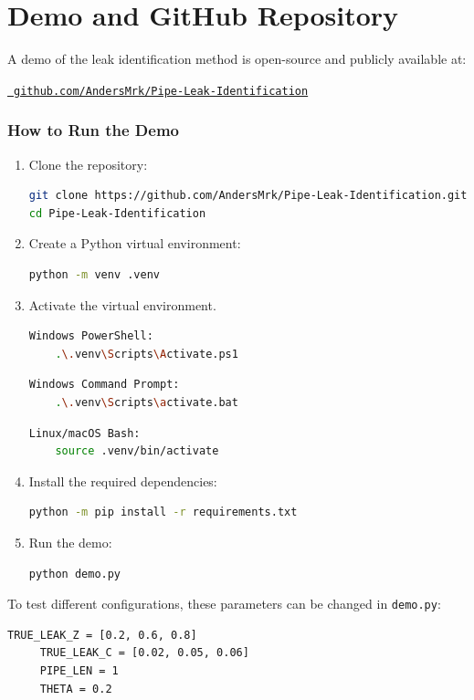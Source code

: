 \chapter{Demo and GitHub Repository}
\label{app:code}

A demo of the leak identification method is open-source and publicly available at: \\

{ \centering 
\href{https://github.com/AndersMrk/Pipe-Leak-Identification}{\faGithub\ \texttt{github.com/AndersMrk/Pipe-Leak-Identification}} \par
}

\subsection*{How to Run the Demo}

\begin{enumerate}
    \item Clone the repository:
    \begin{lstlisting}[language=bash]
git clone https://github.com/AndersMrk/Pipe-Leak-Identification.git
cd Pipe-Leak-Identification
    \end{lstlisting}

    \item Create a Python virtual environment:
    \begin{lstlisting}[language=bash]
python -m venv .venv
    \end{lstlisting}

    \item Activate the virtual environment.
        \begin{lstlisting}[language=bash]
Windows PowerShell:
    .\.venv\Scripts\Activate.ps1
        \end{lstlisting}
        
        \begin{lstlisting}[language=bash]
Windows Command Prompt:
    .\.venv\Scripts\activate.bat
        \end{lstlisting}
    
        \begin{lstlisting}[language=bash]
Linux/macOS Bash:
    source .venv/bin/activate
        \end{lstlisting}

    \item Install the required dependencies:
    \begin{lstlisting}[language=bash]
python -m pip install -r requirements.txt
    \end{lstlisting}

    \item Run the demo:
    \begin{lstlisting}[language=bash]
python demo.py
    \end{lstlisting}
\end{enumerate}

To test different configurations, these parameters can be changed in \texttt{demo.py}:

\begin{lstlisting}[language=bash]
     TRUE_LEAK_Z = [0.2, 0.6, 0.8]
     TRUE_LEAK_C = [0.02, 0.05, 0.06]
     PIPE_LEN = 1
     THETA = 0.2         
\end{lstlisting}
